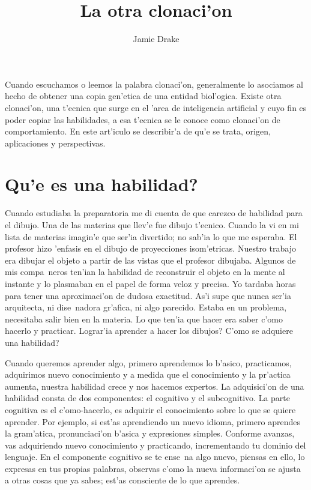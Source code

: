 \documentclass[11pt]{article}
\begin{document}
\title{La otra clonaci'on}
\author{Jamie Drake}

\maketitle
Cuando escuchamos o leemos la palabra clonaci'on, generalmente lo asociamos al hecho de obtener una copia gen'etica de una entidad biol'ogica. Existe otra clonaci'on, una t'ecnica que surge en el 'area de inteligencia artificial y cuyo fin es poder copiar las habilidades, a esa t'ecnica se le conoce como clonaci'on de comportamiento. En este art'iculo se describir'a de qu'e se trata, origen, aplicaciones y perspectivas.

\section{\textquestiondown Qu'e es una habilidad?} 

Cuando estudiaba la preparatoria me di cuenta de que carezco de habilidad para el dibujo. Una de las materias que llev'e fue dibujo t'ecnico. Cuando la vi en mi lista de materias imagin'e que ser'ia divertido; no sab'ia lo que me esperaba. El profesor hizo 'enfasis en el dibujo de proyecciones isom'etricas. Nuestro trabajo era dibujar el objeto a partir de las vistas que el profesor dibujaba. Algunos de mis compa~neros ten'ian la habilidad de reconstruir el objeto en la mente al instante y lo plasmaban en el papel de forma veloz y precisa. Yo tardaba horas para tener una aproximaci'on de dudosa exactitud. As'i supe que nunca ser'ia arquitecta, ni dise~nadora gr'afica, ni algo parecido. Estaba en un problema, necesitaba salir bien en la materia. Lo que ten'ia que hacer era saber c'omo hacerlo y practicar. \textquestiondown Lograr'ia aprender a hacer los dibujos? \textquestiondown C'omo se adquiere una habilidad?

\medskip

Cuando queremos aprender algo, primero aprendemos lo b'asico, practicamos, adquirimos nuevo conocimiento y a medida que el conocimiento y la pr'actica aumenta, nuestra habilidad crece y nos hacemos expertos. La adquisici'on de una habilidad consta de dos componentes: el cognitivo y el subcognitivo. La parte cognitiva es el c'omo-hacerlo, es adquirir el conocimiento sobre lo que se quiere aprender. Por ejemplo, si est'as aprendiendo un nuevo idioma, primero aprendes la gram'atica, pronunciaci'on b'asica y expresiones simples. Conforme avanzas, vas adquiriendo nuevo conocimiento y practicando, incrementando tu dominio del lenguaje. En el componente cognitivo se te ense~na algo nuevo, piensas en ello, lo expresas en tus propias palabras, observas c'omo la nueva informaci'on se ajusta a otras cosas que ya sabes; est'as consciente de lo que aprendes.
\end{document}
